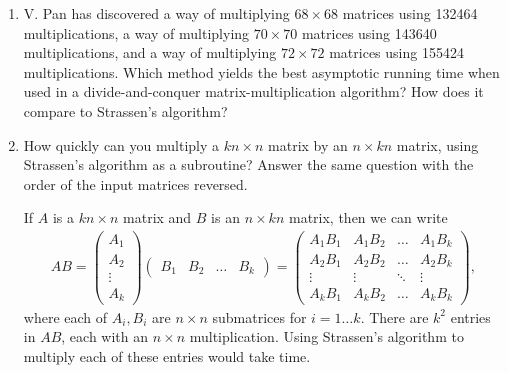 \documentclass[Chapter04]{subfiles}
\begin{document}
\begin{enumerate}
		\item V. Pan has discovered a way of multiplying $68 \times 68$ matrices using \num{132464} multiplications, a way of multiplying $70 \times 70$ matrices using \num{143640} multiplications, and a way of multiplying $72 \times 72$ matrices using \num{155424} multiplications. Which method yields the best asymptotic running time when used in a divide-and-conquer matrix-multiplication algorithm? How does it compare to Strassen's algorithm?
		\begin{answer}
			
		\end{answer}

		\item How quickly can you multiply a $kn \times n$ matrix by an $n \times kn$ matrix, using Strassen's algorithm as a subroutine? Answer the same question with the order of the input matrices reversed.
		\begin{answer}
			If $A$ is a $kn \times n$ matrix and $B$ is an $n \times kn$ matrix, then we can write
			\begin{align*}
				AB =
				\begin{pmatrix}
					A_1\\
					A_2\\
					\vdots\\
					A_k
				\end{pmatrix}
				\begin{pmatrix}
					B_1 & B_2 & \dots & B_k
				\end{pmatrix}
				=
				\begin{pmatrix}
					A_1B_1 & A_1B_2 & \dots & A_1B_k\\
					A_2B_1 & A_2B_2 & \dots & A_2B_k\\
					\vdots & \vdots & \ddots & \vdots\\
					A_kB_1 & A_kB_2 & \dots & A_kB_k
				\end{pmatrix},
			\end{align*}
			where each of $A_i,B_i$ are $n \times n$ submatrices for $i = 1 \dots k$. There are $k^2$ entries in $AB$, each with an $n \times n$ multiplication. Using Strassen's algorithm to multiply each of these entries would take  time.


\end{answer}
\end{enumerate}
\end{document}
